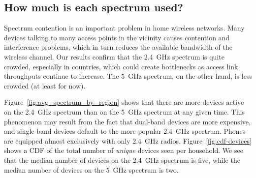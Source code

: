 \subsection{How much is each spectrum used?}\label{sec:spectrum}

Spectrum contention is an important problem in home wireless
networks. Many devices talking to many access points in the vicinity
causes contention and interference problems, which in turn reduces the
available bandwidth of the wireless channel. Our results confirm that
the 2.4~GHz spectrum is quite crowded, especially in \developed{}
countries, which could create bottlenecks as access link throughputs
continue to increase.  The 5~GHz spectrum, on the other hand, is less
crowded (at least for now).

Figure~\ref{fig:avg_spectrum_by_region} shows that there are more
devices active on the 2.4~GHz spectrum than on the 5~GHz spectrum at any
given time. This phenomenon may result from the fact that dual-band
devices are more expensive, and single-band devices default to the more
popular 2.4~GHz spectrum. Phones are equipped almost exclusively with
only 2.4~GHz radios.  Figure~\ref{fig:cdf-devices} shows a CDF of the
total number of {\em unique} devices seen per household. We see that the
median number of devices on the 2.4~GHz spectrum is five, while the
median number of devices on the 5~GHz spectrum is two.

